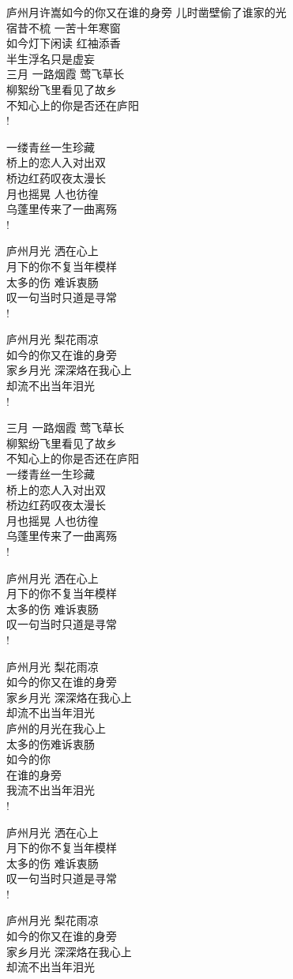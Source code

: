 \begin{poem}{庐州月}{许嵩}{如今的你又在谁的身旁}
儿时凿壁偷了谁家的光\\
宿昔不梳 一苦十年寒窗\\
如今灯下闲读 红袖添香\\
半生浮名只是虚妄\\
三月 一路烟霞 莺飞草长\\
柳絮纷飞里看见了故乡\\
不知心上的你是否还在庐阳\\!

一缕青丝一生珍藏\\
桥上的恋人入对出双\\
桥边红药叹夜太漫长\\
月也摇晃 人也彷徨\\
乌蓬里传来了一曲离殇\\!

庐州月光 洒在心上\\
月下的你不复当年模样\\
太多的伤 难诉衷肠\\
叹一句当时只道是寻常\\!

庐州月光 梨花雨凉\\
如今的你又在谁的身旁\\
家乡月光 深深烙在我心上\\
却流不出当年泪光\\!

三月 一路烟霞 莺飞草长\\
柳絮纷飞里看见了故乡\\
不知心上的你是否还在庐阳\\
一缕青丝一生珍藏\\
桥上的恋人入对出双\\
桥边红药叹夜太漫长\\
月也摇晃 人也彷徨\\
乌蓬里传来了一曲离殇\\!

庐州月光 洒在心上\\
月下的你不复当年模样\\
太多的伤 难诉衷肠\\
叹一句当时只道是寻常\\!

庐州月光 梨花雨凉\\
如今的你又在谁的身旁\\
家乡月光 深深烙在我心上\\
却流不出当年泪光\\
庐州的月光在我心上\\
太多的伤难诉衷肠\\
如今的你\\
在谁的身旁\\
我流不出当年泪光\\!

庐州月光 洒在心上\\
月下的你不复当年模样\\
太多的伤 难诉衷肠\\
叹一句当时只道是寻常\\!

庐州月光 梨花雨凉\\
如今的你又在谁的身旁\\
家乡月光 深深烙在我心上\\
却流不出当年泪光\\
\end{poem}
